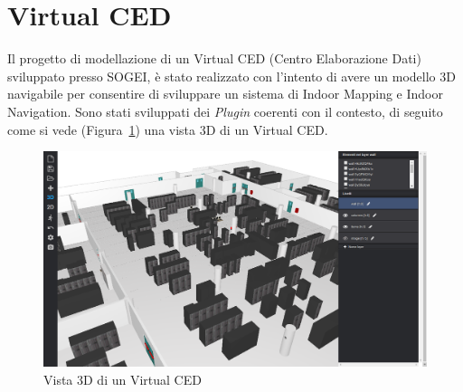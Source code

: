 \section{Virtual CED}
\label{sec:chapter_4_section_2}
Il progetto di modellazione di un Virtual CED (Centro Elaborazione Dati) sviluppato presso SOGEI, \`e stato realizzato con
l'intento di avere un modello 3D navigabile per consentire di sviluppare un sistema di Indoor Mapping e Indoor Navigation.
Sono stati sviluppati dei \emph{Plugin} coerenti con il contesto, di seguito come si vede (Figura~\ref{fig:virtualCED}) una
vista 3D di un Virtual CED.\\

\begin{figure}[htbp] %
   \centering
   \includegraphics[width=1\linewidth]{images/virtualCED}
   \caption{Vista 3D di un Virtual CED}
   \label{fig:virtualCED}
   \end{figure}

